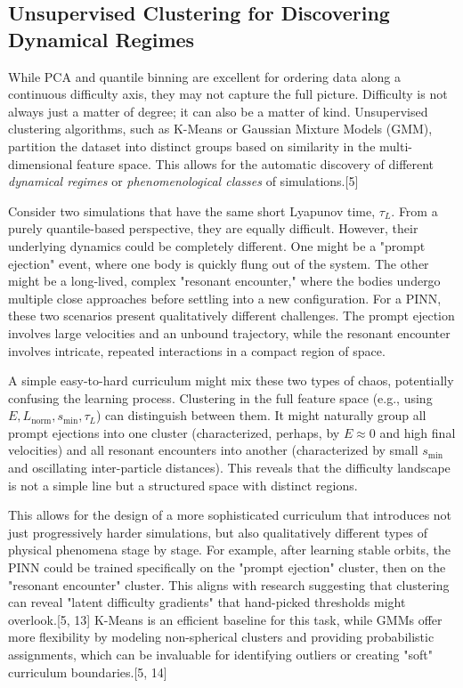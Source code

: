 \documentclass[11pt, letterpaper]{article}
\begin{document}
\subsection{Unsupervised Clustering for Discovering Dynamical Regimes}

While PCA and quantile binning are excellent for ordering data along a continuous difficulty axis, they may not capture the full picture. Difficulty is not always just a matter of degree; it can also be a matter of kind. Unsupervised clustering algorithms, such as K-Means or Gaussian Mixture Models (GMM), partition the dataset into distinct groups based on similarity in the multi-dimensional feature space. This allows for the automatic discovery of different \textit{dynamical regimes} or \textit{phenomenological classes} of simulations.[5]

Consider two simulations that have the same short Lyapunov time, $\tau_L$. From a purely quantile-based perspective, they are equally difficult. However, their underlying dynamics could be completely different. One might be a "prompt ejection" event, where one body is quickly flung out of the system. The other might be a long-lived, complex "resonant encounter," where the bodies undergo multiple close approaches before settling into a new configuration. For a PINN, these two scenarios present qualitatively different challenges. The prompt ejection involves large velocities and an unbound trajectory, while the resonant encounter involves intricate, repeated interactions in a compact region of space.

A simple easy-to-hard curriculum might mix these two types of chaos, potentially confusing the learning process. Clustering in the full feature space (e.g., using $E, L_{\text{norm}}, s_{\text{min}}, \tau_L$) can distinguish between them. It might naturally group all prompt ejections into one cluster (characterized, perhaps, by $E \approx 0$ and high final velocities) and all resonant encounters into another (characterized by small $s_{\text{min}}$ and oscillating inter-particle distances). This reveals that the difficulty landscape is not a simple line but a structured space with distinct regions.

This allows for the design of a more sophisticated curriculum that introduces not just progressively harder simulations, but also qualitatively different types of physical phenomena stage by stage. For example, after learning stable orbits, the PINN could be trained specifically on the "prompt ejection" cluster, then on the "resonant encounter" cluster. This aligns with research suggesting that clustering can reveal "latent difficulty gradients" that hand-picked thresholds might overlook.[5, 13] K-Means is an efficient baseline for this task, while GMMs offer more flexibility by modeling non-spherical clusters and providing probabilistic assignments, which can be invaluable for identifying outliers or creating "soft" curriculum boundaries.[5, 14]
\end{document}
